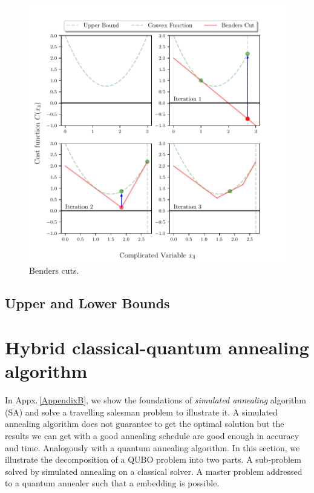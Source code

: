 \begin{figure}[H]
\centering
\includegraphics[width=\textwidth]{Figures/BenderIlustration.pdf} 
\caption{Benders cuts.}
\label{fig:BDIlustration}
\end{figure}

\subsection{Upper and Lower Bounds}
\section{Hybrid classical-quantum annealing algorithm}
In Appx.\,\ref{AppendixB}, we show the foundations of \textit{simulated annealing} algorithm (SA) and solve a travelling salesman problem to illustrate it. A simulated annealing algorithm does not guarantee to get the optimal solution but the results we can get with a good annealing schedule are good enough in accuracy and time. Analogously with a quantum annealing algorithm. In this section, we illustrate the decomposition of a QUBO problem into two parts. A sub-problem solved by simulated annealing on a classical solver. A master problem addressed to a quantum annealer such that a embedding is possible.
